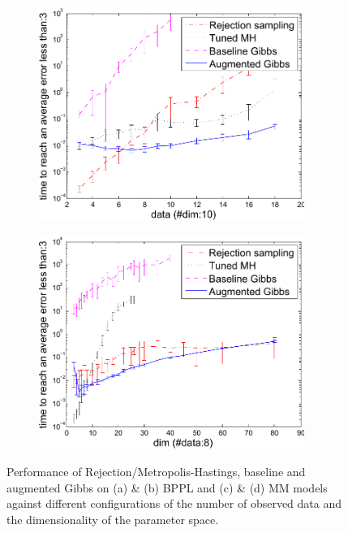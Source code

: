 \begin{figure}[thb!]
%
\centering
\begin{subfigure}{.49\textwidth}
  \centering
  \includegraphics[width=0.95\textwidth]{plot/mmm_data_analysis2.pdf}
  \caption{}
  \label{fig:mmm_data_analysis}
\end{subfigure}
\begin{subfigure}{.49\textwidth}
  \centering
  \hspace{5mm} \includegraphics[width=0.95\textwidth]{plot/mmm_dim_analysis10.pdf}
  \caption{}
  \label{fig:mmm_dim_analysis}
\end{subfigure}
\caption{Performance of Rejection/Metropolis-Hastings, baseline and augmented Gibbs on (a) \& (b) BPPL and (c) \& (d) MM models against different configurations of the number of observed data and the dimensionality of the parameter space.}
\label{fig:results}
\end{figure}

